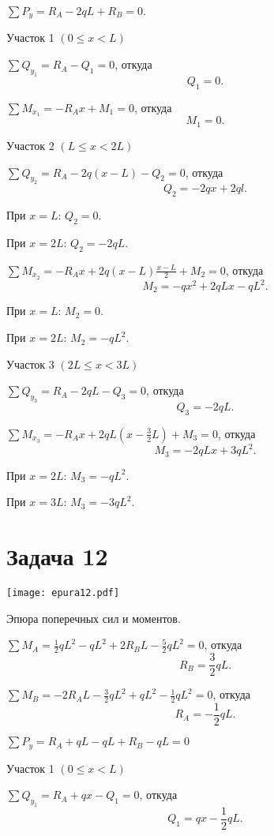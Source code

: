 $\sum P_y = R_A - 2 q L + R_B = 0$.

Участок 1 $\left(0 \le x < L\right)$

$\sum Q_{y_1} = R_A - Q_1 = 0 $,
откуда
\[
    Q_1 = 0.
\]

$\sum M_{x_1} = -R_A x + M_1 = 0 $,
откуда
\[
    M_1 = 0.
\]

Участок 2 $\left(L \le x < 2L\right)$

$\sum Q_{y_2} = R_A - 2q(x - L) - Q_2 = 0$,
откуда
\[
    Q_2 = -2qx + 2ql.
\]

При $x = L$: $Q_2 = 0$.

При $x = 2L$: $Q_2 = -2qL$.

$\sum M_{x_2} = -R_A x + 2q (x - L) \frac{x-L}{2} + M_2 = 0$,
откуда
\[
    M_2 = -qx^2 + 2qLx - qL^2.
\]

При $x = L$: $M_2 = 0$.

При $x = 2L$: $M_2 = -qL^2$.

Участок 3 $\left(2L \le x < 3L\right)$

$\sum Q_{y_3} = R_A - 2qL - Q_3 = 0$,
откуда
\[
    Q_3 = -2qL.
\]

$\sum M_{x_3} = -R_A x + 2q L \left(x - \frac{3}{2} L\right) + M_3 = 0$,
откуда
\[
    M_3 = -2qLx + 3qL^2.
\]

При $x = 2L$: $M_3 = -qL^2$.

При $x = 3L$: $M_3 = -3qL^2$.

\newpage


\section{Задача 12}

\begin{floatingfigure}[r]{0.5\textwidth}
    \centering
    \texttt{[image: epura12.pdf]}
    \caption{Эпюра поперечных сил и моментов.}
    \label{fig:chap1-epura12}
\end{floatingfigure}

$\sum M_A = \frac{1}{2} q L^2 - q L^2 + 2 R_B L - \frac{5}{2} q L^2 = 0$,
откуда
\[
    R_B = \frac{3}{2} qL.
\]

$ \sum M_B = -2 R_A L - \frac{3}{2} q L^2 + q L^2 - \frac{1}{2} q L^2 = 0 $,
откуда
\[
    R_A = -\frac{1}{2} qL.
\]

$\sum P_y = R_A + qL - qL + R_B - qL = 0$

Участок 1 $\left(0 \le x < L\right)$

$\sum Q_{y_1} = R_A + qx - Q_1 = 0$,
откуда
\[
    Q_1 = qx - \frac{1}{2} qL.
\]

